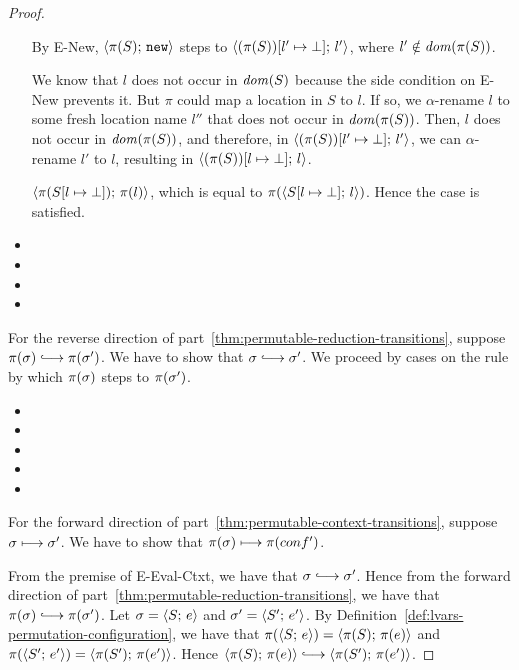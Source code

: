 \begin{proof}
\begin{itemize}
      By {\sc E-New}, $\langle \pi(S);\, \mbox{\texttt{new}} \rangle$ steps to
      $\langle (\pi(S))[l' \mapsto \bot];\, l' \rangle$, where $l' \notin
      \mathit{dom}(\pi(S))$.

      We know that $l$ does not occur in $\mathit{dom}(S)$ because the side
      condition on {\sc E-New} prevents it.  But $\pi$ could map a
      location in $S$ to $l$.  If so, we $\alpha$-rename $l$ to some
      fresh location name $l''$ that does not occur in $\mathit{dom}(\pi(S))$.
      Then, $l$ does not occur in $\mathit{dom}(\pi(S))$, and therefore, in
      $\langle (\pi(S))[l' \mapsto \bot];\, l' \rangle$, we can
      $\alpha$-rename $l'$ to $l$, resulting in
      $\langle (\pi(S))[l \mapsto \bot];\, l \rangle$.


      $\langle \pi(S[l \mapsto \bot]);\, \pi(l) \rangle$, which is equal to
      $\pi(\langle S[l \mapsto \bot];\, l \rangle)$.  Hence the case is
      satisfied.

    \item {}
    \item {}
    \item {}
    \item {}
  \end{itemize}

  For the reverse direction of
  part~\ref{thm:permutable-reduction-transitions}, suppose $\pi(\conf)
  \parstepsto \pi(\conf')$.  We have to show that $\conf \parstepsto
  \conf'$.  We proceed by cases on the rule by which $\pi(\sigma)$
  steps to $\pi(\sigma')$.

  \begin{itemize}
    \item {}
    \item {}
    \item {}
    \item {}
    \item {}
  \end{itemize}

  For the forward direction of
  part~\ref{thm:permutable-context-transitions}, suppose $\sigma
  \longmapsto \sigma'$.  We have to show that $\pi(\sigma) \longmapsto
  \pi(conf')$.

  From the premise of {\sc E-Eval-Ctxt}, we have that $\conf
  \parstepsto \conf'$.  Hence from the forward direction of
  part~\ref{thm:permutable-reduction-transitions}, we have that
  $\pi(\conf) \parstepsto \pi(\conf')$.  Let $\sigma = \langle S;\, e \rangle$
  and $\sigma' = \langle S';\, e' \rangle$.  By
  Definition~\ref{def:lvars-permutation-configuration}, we have that
  $\pi(\langle S;\, e \rangle) = \langle \pi(S);\, \pi(e) \rangle$ and
  $\pi(\langle S';\, e' \rangle) = \langle \pi(S');\, \pi(e') \rangle$.  Hence
  $\config{\pi(S)}{\pi(e)} \parstepsto \config{\pi(S')}{\pi(e')}$.


\end{proof}
